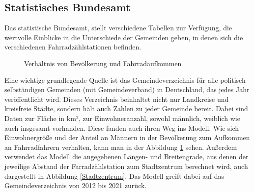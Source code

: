 \documentclass[a4paper,12pt]{thesis}
\begin{document}
\subsection{Statistisches Bundesamt}

Das statistische Bundesamt, stellt verschiedene Tabellen zur Verfügung, die wertvolle Einblicke in die Unterschiede der Gemeinden geben, in denen sich die verschiedenen Fahrradzählstationen befinden.\\

\begin{figure}%
	\centering
	\qquad
	\caption{Verhältnis von Bevölkerung und Fahrradaufkommen}%
	\label{fig:Gemeindevz}%
\end{figure}

Eine wichtige grundlegende Quelle ist das Gemeindeverzeichnis für alle politisch selbständigen Gemeinden (mit Gemeindeverband) in Deutschland, das jedes Jahr veröffentlicht wird. Dieses Verzeichnis beinhaltet nicht nur Landkreise und kreisfreie Städte, sondern hält auch Zahlen zu jeder Gemeinde bereit. Dabei sind Daten zur Fläche in km², zur Einwohneranzahl, sowohl männlich, weiblich wie auch insgesamt vorhanden. Diese fanden auch ihren Weg ins Modell. Wie sich Einwohnergröße und der Anteil an Männern in der Bevölkerung zum Aufkommen an Fahrradfahrern verhalten, kann man in der Abbildung \ref{fig:Gemeindevz} sehen. Außerdem verwendet das Modell die angegebenen Längen- und Breitengrade, aus denen der jeweilige Abstand der Farradzählstation zum Stadtzentrum berechnet wird, auch dargestellt in Abbildung \ref{Stadtzentrum}. Das Modell greift dabei auf das Gemeindeverzeichnis von 2012 bis 2021 zurück.\\
\end{document}
